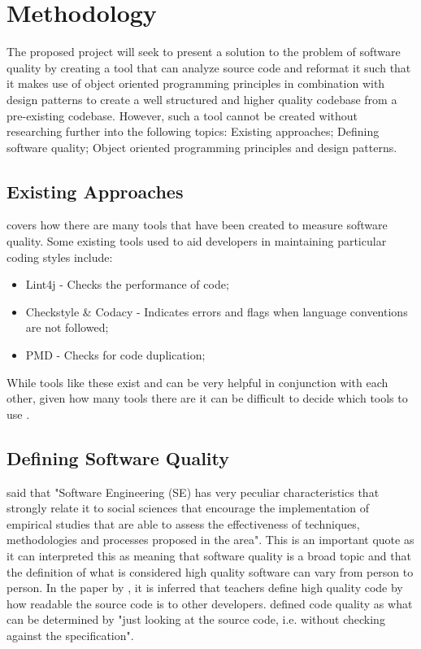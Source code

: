 \section{Methodology}

The proposed project will seek to present a solution to the problem of software quality by creating a tool that can analyze source code and reformat it such that it makes use of object oriented programming principles in combination with design patterns to create a well structured and higher quality codebase from a pre-existing codebase.
However, such a tool cannot be created without researching further into the following topics: Existing approaches; Defining software quality; Object oriented programming principles and design patterns.

\subsection{Existing Approaches}
\cite{8681007} covers how there are many tools that have been created to measure software quality. Some existing tools used to aid developers in maintaining particular coding styles include:
\begin{itemize}
	\item Lint4j - Checks the performance of code;
	\item Checkstyle \& Codacy - Indicates errors and flags when language conventions are not followed;
	\item PMD - Checks for code duplication;
\end{itemize}
While tools like these exist and can be very helpful in conjunction with each other, given how many tools there are it can be difficult to decide which tools to use \citep{6606742}.

\subsection{Defining Software Quality}
\cite{6606742} said that "Software Engineering (SE) has very peculiar characteristics that strongly relate it to social sciences that encourage the implementation of empirical studies that are able to assess the effectiveness of techniques, methodologies and processes proposed in the area". This is an important quote as it can interpreted this as meaning that software quality is a broad topic and that the definition of what is considered high quality software can vary from person to person. In the paper by \cite{10.1145/3428029.3428047}, it is inferred that teachers define high quality code by how readable the source code is to other developers. \cite{10.1145/3428029.3428047, 10.1145/2674683.2674702} defined code quality as what can be determined by "just looking at the source code, i.e. without checking against the specification".

